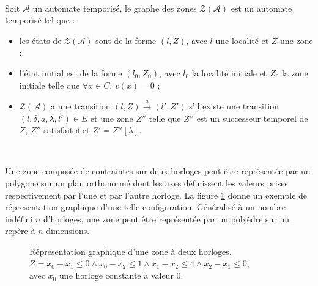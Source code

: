         ~

        Soit $\mathcal{A}$ un automate temporisé, le graphe des zones
        $\mathcal{Z}(\mathcal{A})$ est un automate temporisé tel que :
      
        \begin{itemize}
          \item les états de $\mathcal{Z}(\mathcal{A})$ sont de la forme
            $(l,Z)$, avec $l$ une localité et $Z$ une zone ;
          \item l'état initial est de la forme $(l_0,Z_0)$, avec $l_0$ la
            localité initiale et $Z_0$ la zone initiale telle que $\forall x \in
            C$, $v(x) = 0$ ;
          \item $\mathcal{Z}(\mathcal{A})$ a une transition
            $(l,Z)\xrightarrow{a}(l',Z')$ s'il existe une transition
            $(l,\delta,a,\lambda,l') \in E$ et une zone $Z''$ telle que $Z''$
            est un successeur temporel de $Z$, $Z''$ satisfait $\delta$ et $Z' =
            Z''[\lambda]$.
        \end{itemize}
        ~

        Une zone composée de contraintes sur deux horloges peut être représentée
        par un polygone sur un plan orthonormé dont les axes définissent les
        valeurs prises respectivement par l'une et par l'autre horloge. La
        figure \ref{fig:representation-zone} donne un exemple de répresentation
        graphique d'une telle configuration. Généralisé à un nombre indéfini
        $n$ d'horloges, une zone peut être représentée par un polyèdre sur un
        repère à $n$ dimensions.

        \begin{figure}[!ht]
          \centering
          \caption{Répresentation graphique d'une zone à deux horloges. \\
            $Z = x_0 - x_1 \leq 0 \wedge x_0 - x_2 \leq 1 \wedge x_1 - x_2 \leq
            4 \wedge x_2 - x_1 \leq 0$, \\
            avec $x_0$ une horloge constante à valeur $0$.}
          \label{fig:representation-zone}
        \end{figure}


